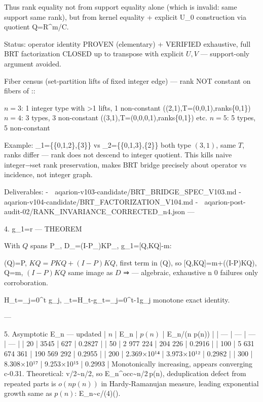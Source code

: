 Thus rank equality not from support equality alone (which is invalid: same support \not\Rightarrow same rank), but from kernel equality + explicit U_0 construction via quotient Q=R^m/C.

Status: operator identity  PROVEN (elementary) + VERIFIED exhaustive, full BRT factorization CLOSED up to transpose with explicit $U,V$ — support-only argument avoided.

Fiber census (set-partition lifts of fixed integer edge) — rank NOT constant on fibers of \pi:\to{}:

$n=3$: 1 integer type with >1 lifts, 1 non-constant ((2,1),T=(0,0,1),ranks\{0,1\})
$n=4$: 3 types, 3 non-constant ((3,1),T=(0,0,0,1),ranks\{0,1\}) etc.
$n=5$: 5 types, 5 non-constant

Example: \Pi_1=\{\{0,1,2\},\{3\}\} vs \Pi_2=\{\{0,1,3\},\{2\}\} both type $(3,1)$, same $T$, ranks differ — rank does not descend to integer quotient. This kills naive integer→set rank preservation, makes BRT bridge precisely about operator vs incidence, not integer graph.

Deliverables:
-
📎 aqarion-v103-candidate/BRT_BRIDGE_SPEC_V103.md
-
📎 aqarion-v104-candidate/BRT_FACTORIZATION_V104.md
-
📎 aqarion-post-audit-02/RANK_INVARIANCE_CORRECTED_n4.json
---

4. g_1=r — THEOREM

With $Q$ spans P_\Pi, D_\Pi=(I-P_\Pi)KP_\Pi, g_1=[Q,KQ]-m:

(Q)=P, $KQ=P KQ+(I-P)KQ$, first term in (Q), so [Q,KQ]=m+((I-P)KQ), Q=m, $(I-P)KQ$ same image as $D$ ⇒  — algebraic, exhaustive n 0 failures only corroboration.

H_t=\sum_{j=0}^t g_j, \Delta_t=H_t-g_t=\sum_{j=0}^{t-1}g_j monotone exact identity.

---

5. Asymptotic E_n — updated
| $n$ | E_n | $p(n)$ | E_n/(n p(n)) |
| --- | --- | --- | --- |
| 20 | 3545 | 627 | 0.2827 |
| 50 | 2 977 224 | 204 226 | 0.2916 |
| 100 | 5 631 674 361 | 190 569 292 | 0.2955 |
| 200 | 2.369×10¹⁴ | 3.973×10¹² | 0.2982 |
| 300 | 8.308×10¹⁷ | 9.253×10¹⁵ | 0.2993 |
Monotonically increasing, appears converging c-0.31. Theoretical: \sum\lfloor v/2\rfloor\sim n/2, so E_n^{\rm occ}\sim n/2\,p(n), deduplication defect from repeated parts is $o(n p(n))$ in Hardy-Ramanujan measure, leading exponential growth same as $p(n)$: E_n\sim c/(4)\exp(\pi{}).

